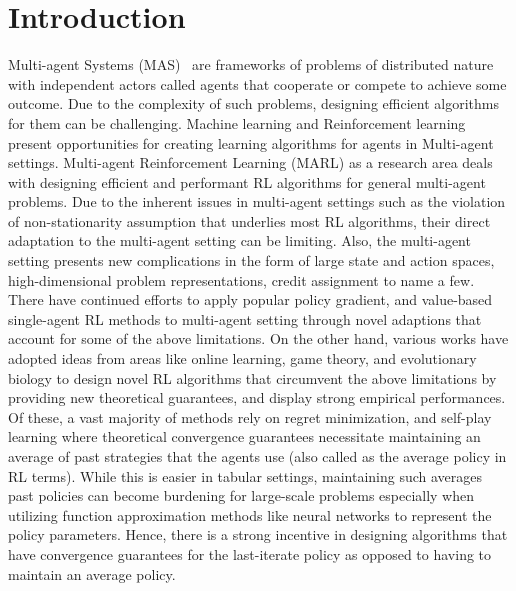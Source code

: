 \chapter{Introduction}

Multi-agent Systems (MAS)~\cite{tuylsMultiagent2012} are frameworks of problems of distributed
nature with independent actors called agents that cooperate or compete to achieve some outcome.
Due to the complexity of such problems, designing efficient algorithms for them can be challenging.
Machine learning and Reinforcement learning present opportunities for creating learning algorithms
for agents in Multi-agent settings.
Multi-agent Reinforcement Learning (MARL) as a research area deals with designing efficient and
performant RL algorithms for general multi-agent problems.
Due to the inherent issues in multi-agent settings such as the violation of non-stationarity
assumption that underlies most RL algorithms, their direct adaptation to the multi-agent setting
can be limiting.
Also, the multi-agent setting presents new complications in the form of large state and action
spaces, high-dimensional problem representations, credit assignment to name a few.
There have continued efforts to apply popular policy gradient, and value-based single-agent RL
methods to multi-agent setting through novel adaptions that account for some of the above
limitations.
On the other hand, various works have adopted ideas from areas like online learning, game theory,
and evolutionary biology to design novel RL algorithms that circumvent the above limitations by
providing new theoretical guarantees, and display strong empirical performances.
Of these, a vast majority of methods rely on regret minimization, and self-play learning where
theoretical convergence guarantees necessitate maintaining an average of past strategies that the
agents use (also called as the average policy in RL terms).
While this is easier in tabular settings, maintaining such averages past policies can become
burdening for large-scale problems especially when utilizing function approximation methods like
neural networks to represent the policy parameters.
Hence, there is a strong incentive in designing algorithms that have convergence guarantees for the
last-iterate policy as opposed to having to maintain an average policy.

